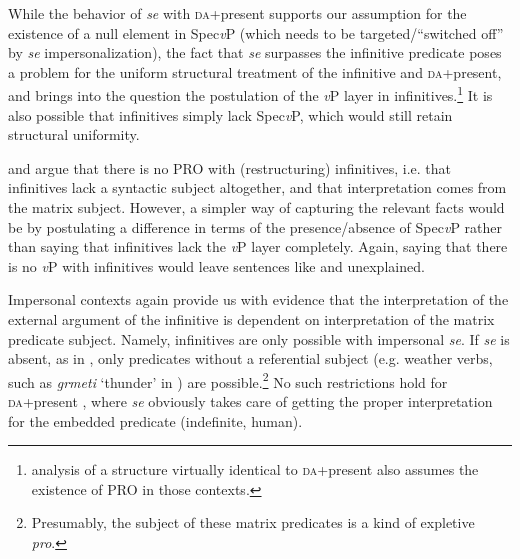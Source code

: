 \documentclass[output=paper,modfonts,newtxmath,hidelinks,]{langscibook}
\begin{document}
\ea \label{7:ex14}
	\z
\z

\noindent While the behavior of \textit{se} with \textsc{da}+present supports our assumption for the existence of a null element in Spec\textit{v}P (which needs to be targeted/``switched off'' by \textit{se} impersonalization), the fact that \textit{se} surpasses the infinitive predicate poses a problem for the uniform structural treatment of the infinitive and \textsc{da}+present, and brings into the question the postulation of the \textit{v}P layer in infinitives.\footnote{\label{7:fn5} analysis of a structure virtually identical to \textsc{da}+present also assumes the existence of PRO in those contexts.} It is also possible that infinitives simply lack Spec\textit{v}P, which would still retain structural uniformity.\largerpage[2]

\citet{Wurmbrand2003} and \citet{TodorovicWurmbrand2015} argue that there is no PRO with (restructuring) infinitives, i.e. that infinitives lack a syntactic subject altogether, and that interpretation comes from the matrix subject. However, a simpler way of capturing the relevant facts would be by postulating a difference in terms of the presence/absence of Spec\textit{v}P rather than saying that infinitives lack the \textit{v}P layer completely. Again, saying that there is no \textit{v}P with infinitives would leave sentences like  and  unexplained.

Impersonal contexts again provide us with evidence that the interpretation of the external argument of the infinitive is dependent on interpretation of the matrix predicate subject. Namely, infinitives are only possible with impersonal \textit{se}. If \textit{se} is absent, as in , only predicates without a referential subject (e.g. weather verbs, such as \textit{grmeti} ‘thunder’ in ) are possible.\footnote{\label{7:fn6}Presumably, the subject of these matrix predicates is a kind of expletive \textit{pro}.} No such restrictions hold for \textsc{da}+present , where \textit{se} obviously takes care of getting the proper interpretation for the embedded predicate (indefinite, human).
\end{document}
